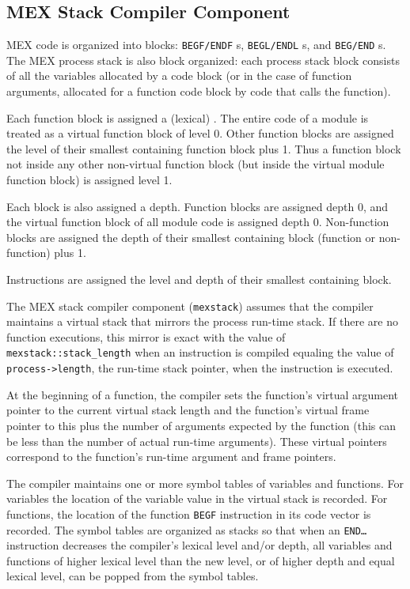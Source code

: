 \documentclass[12pt]{article}
\begin{document}
\subsection{MEX Stack Compiler Component}
\label{MEX-STACK-COMPILER-COMPONENT}

MEX code is organized into blocks: {\tt BEGF/ENDF} s,
{\tt BEGL/ENDL} s, and {\tt BEG/END} s.
The MEX process stack is also block organized:
each process stack block consists of all the variables allocated
by a code block (or in the case of function arguments, allocated for
a function code block by code that calls the function).

Each function block is assigned a (lexical) .
The entire code of a module is treated as a virtual function block
of level 0.  Other function blocks are assigned the level of their
smallest containing function block plus 1.  Thus
a function block not inside any other non-virtual function block
(but inside the virtual module function block) is assigned level 1.

Each block is also assigned a depth.  Function blocks are assigned depth
0, and the virtual function block of all module code is assigned depth 0.
Non-function blocks are assigned the depth
of their smallest containing block (function or non-function) plus 1.

Instructions are assigned the level and depth of their smallest containing
block.

The MEX stack compiler component ({\tt mexstack}) assumes that the compiler
maintains a virtual stack that mirrors the process run-time stack.
If there are no function executions, this mirror is exact with the value of
{\tt mexstack::\EOL stack\_\EOL length}
when an instruction is compiled equaling the value of
{\tt process->length}, the run-time stack pointer, when the
instruction is executed.

At the beginning of a function, the compiler sets the
function's virtual argument pointer
to the current virtual stack length and the function's virtual
frame pointer to this plus the number of arguments expected by the
function (this can be less than the number of actual run-time arguments).
These virtual pointers correspond to the function's run-time argument
and frame pointers.

The compiler maintains one or more symbol tables of variables
and functions.  For variables the location of the variable value
in the virtual stack is recorded.  For functions, the location of
the function {\tt BEGF} instruction in its code vector is recorded.
The symbol tables are organized as stacks so that
when an {\tt END\ldots} instruction decreases the compiler's lexical
level and/or depth, all variables and functions of higher lexical level
than the new level, or of higher depth and equal lexical level, can be
popped from the symbol tables.
\end{document}
